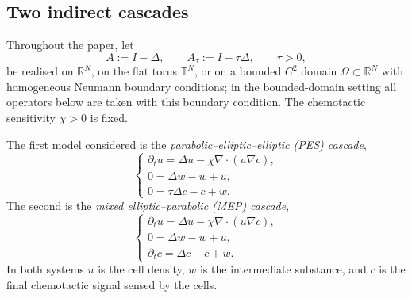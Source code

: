\documentclass[11pt,reqno]{amsart}
\theoremstyle{definition}
\theoremstyle{remark}
\newcommand{\R}{\mathbb{R}}
\newcommand{\T}{\mathbb{T}}
\newcommand{\Div}{\nabla\!\cdot}
\begin{document}
\subsection{Two indirect cascades}
\label{subsec:two-cascades}

Throughout the paper, let
\begin{equation}\label{eq:notation-A}
        A:=I-\Delta,
        \qquad
        A_\tau:=I-\tau\Delta,
        \qquad
        \tau>0,
\end{equation}
be realised on $\R^{N}$, on the flat torus $\T^{N}$, or on a bounded $C^{2}$ domain $\Omega\subset\R^{N}$ with homogeneous Neumann boundary conditions; in the bounded-domain setting all operators below are taken with this boundary condition. The chemotactic sensitivity $\chi>0$ is fixed.

The first model considered is the \emph{parabolic--elliptic--elliptic (PES) cascade},
\begin{equation}\label{eq:PES-intro}\tag{PES}
\begin{cases}
        \partial_t u=\Delta u-\chi\Div(u\nabla c),\\[1mm]
        0=\Delta w-w+u,\\[1mm]
        0=\tau\Delta c-c+w.
\end{cases}
\end{equation}
The second is the \emph{mixed elliptic--parabolic (MEP) cascade},
\begin{equation}\label{eq:MEP-intro}\tag{MEP}
\begin{cases}
        \partial_t u=\Delta u-\chi\Div(u\nabla c),\\[1mm]
        0=\Delta w-w+u,\\[1mm]
        \partial_t c=\Delta c-c+w.
\end{cases}
\end{equation}
In both systems $u$ is the cell density, $w$ is the intermediate substance, and $c$ is the final chemotactic signal sensed by the cells.
\end{document}
